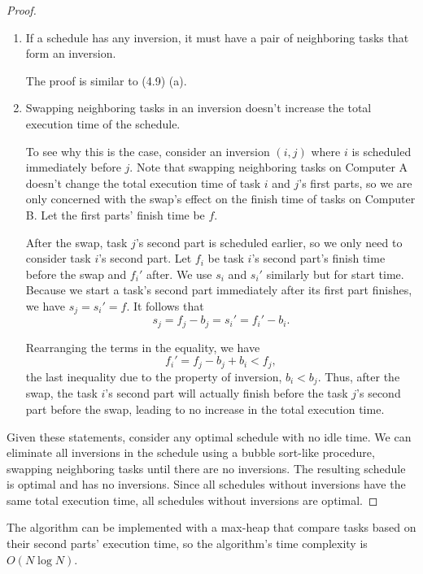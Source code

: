 \documentclass{article}
\begin{document}
\begin{enumerate}
\begin{proof}
\begin{enumerate}
        \item If a schedule has any inversion, it must have a pair of neighboring tasks that form an inversion.
        
        The proof is similar to (4.9) (a).

        \item Swapping neighboring tasks in an inversion doesn't increase the total execution time of the schedule.
        
        To see why this is the case, consider an inversion $(i, j)$ where $i$ is scheduled immediately before $j$. Note that swapping neighboring tasks on Computer A doesn't change the total execution time of task $i$ and $j$'s first parts, so we are only concerned with the swap's effect on the finish time of tasks on Computer B. Let the first parts' finish time be $f$.

        After the swap, task $j$'s second part is scheduled earlier, so we only need to consider task $i$'s second part. Let $f_i$ be task $i$'s second part's finish time before the swap and $f_i'$ after. We use $s_i$ and $s_i'$ similarly but for start time. Because we start a task's second part immediately after its first part finishes, we have $s_j = s_i' = f$. It follows that
        $$
            s_j = f_j - b_j = s_i' = f_i' - b_i.
        $$

        Rearranging the terms in the equality, we have
        $$
            f_i' = f_j - b_j + b_i < f_j,
        $$
        the last inequality due to the property of inversion, $b_i < b_j$. Thus, after the swap, the task $i$'s second part will actually finish before the task $j$'s second part before the swap, leading to no increase in the total execution time.
    \end{enumerate}

    Given these statements, consider any optimal schedule with no idle time. We can eliminate all inversions in the schedule using a bubble sort-like procedure, swapping neighboring tasks until there are no inversions. The resulting schedule is optimal and has no inversions. Since all schedules without inversions have the same total execution time, all schedules without inversions are optimal.
\end{proof}

The algorithm can be implemented with a max-heap that compare tasks based on their second parts' execution time, so the algorithm's time complexity is $O(N\log N)$.

\end{enumerate}
\end{document}
